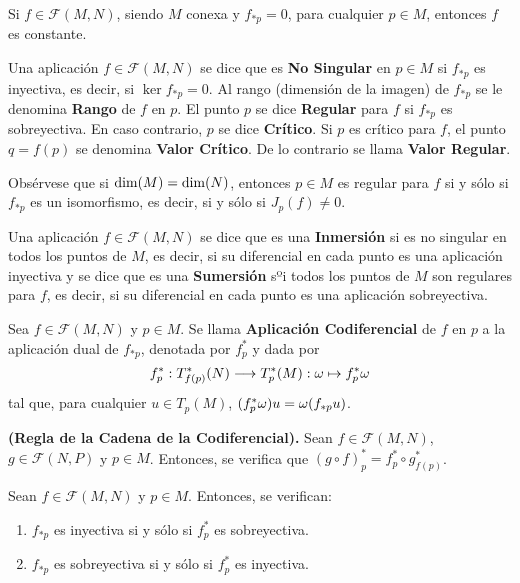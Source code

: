 \documentclass[cursovd_portada.tex]{subfiles}
\begin{document}
\begin{prop} Si $f\in\mathcal{F}(M,N)$, siendo $M$ conexa y $f_{*p}=0$, para cual\-quier $p\in M$, entonces $f$
es constante.
\end{prop}
\begin{defi}
Una aplicación $f\in\mathcal{F}(M,N)$ se dice que es {\bf No Singular} en $p\in M$ si $f_{*p}$ es inyectiva, es
decir, si $\ker f_{*p}=0$. Al rango (dimensión de la imagen) de $f_{*p}$ se le denomina {\bf Rango} de $f$ en $p$.
El punto $p$ se dice {\bf Regular} para $f$ si $f_{*p}$ es sobreyectiva. En caso contrario, $p$ se dice {\bf
Crítico}. Si $p$ es crítico para $f$, el punto $q=f(p)$ se denomina {\bf Valor Crítico}. De lo contrario se llama
{\bf Valor Regular}.
\end{defi}
Obsérvese que si ${\rm dim}(M)={\rm dim}(N)$, entonces $p\in M$ es regular para $f$ si y sólo si $f_{*p}$ es un
isomorfismo, es decir, si y sólo si $J_p(f)\neq 0$.
\begin{defi}
Una aplicación $f\in\mathcal{F}(M,N)$ se dice que es una {\bf Inmersión} si es no singular en todos los puntos de
$M$, es decir, si su diferencial en cada punto es una aplicación inyectiva y se dice que es una {\bf Sumersión} sºi
todos los puntos de $M$ son regulares para $f$, es decir, si su diferencial en cada punto es una aplicación
sobreyectiva.
\end{defi}
\begin{defi}
Sea $f\in\mathcal{F}(M,N)$ y $p\in M$. Se llama {\bf Aplicación Co\-di\-fe\-ren\-cial} de $f$ en $p$ a la
aplicación dual de $f_{*p}$, denotada por $f_p^*$ y dada por
$$f_p^*:T_{f(p)}^*(N)\longrightarrow T_p^*(M):\omega\mapsto f_p^*\omega$$
tal que, para cualquier $u\in T_p(M)$, $(f_p^*\omega)u=\omega(f_{*p}u)$.
\end{defi}
\begin{prop}
{\bf (Regla de la Cadena de la Codiferencial).} Sean $f\in\mathcal{F}(M,N)$, $g\in\mathcal{F}(N,P)$ y $p\in M$.
Entonces, se verifica que $(g\circ f)_p^*=f_p^*\circ g_{f(p)}^*$.
\end{prop}
\begin{prop}
Sean $f\in\mathcal{F}(M,N)$ y $p\in M$. Entonces, se verifican:
\begin{enumerate}
\item $f_{*p}$ es inyectiva si y sólo si $f_p^*$ es sobreyectiva.
\item $f_{*p}$ es sobreyectiva si y sólo si $f_p^*$ es inyectiva.
\end{enumerate}
\end{prop}
\newpage
\end{document}
